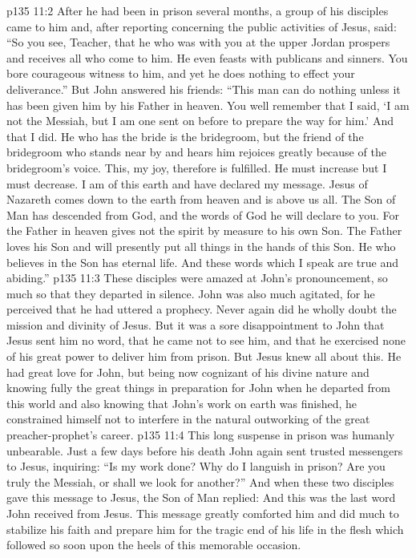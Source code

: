 \vs p135 11:2 \pc After he had been in prison several months, a group of his disciples came to him and, after reporting concerning the public activities of Jesus, said: “So you see, Teacher, that he who was with you at the upper Jordan prospers and receives all who come to him. He even feasts with publicans and sinners. You bore courageous witness to him, and yet he does nothing to effect your deliverance.” But John answered his friends: “This man can do nothing unless it has been given him by his Father in heaven. You well remember that I said, ‘I am not the Messiah, but I am one sent on before to prepare the way for him.’ And that I did. He who has the bride is the bridegroom, but the friend of the bridegroom who stands near by and hears him rejoices greatly because of the bridegroom’s voice. This, my joy, therefore is fulfilled. He must increase but I must decrease. I am of this earth and have declared my message. Jesus of Nazareth comes down to the earth from heaven and is above us all. The Son of Man has descended from God, and the words of God he will declare to you. For the Father in heaven gives not the spirit by measure to his own Son. The Father loves his Son and will presently put all things in the hands of this Son. He who believes in the Son has eternal life. And these words which I speak are true and abiding.”
\vs p135 11:3 \pc These disciples were amazed at John’s pronouncement, so much so that they departed in silence. John was also much agitated, for he perceived that he had uttered a prophecy. Never again did he wholly doubt the mission and divinity of Jesus. But it was a sore disappointment to John that Jesus sent him no word, that he came not to see him, and that he exercised none of his great power to deliver him from prison. But Jesus knew all about this. He had great love for John, but being now cognizant of his divine nature and knowing fully the great things in preparation for John when he departed from this world and also knowing that John’s work on earth was finished, he constrained himself not to interfere in the natural outworking of the great preacher\hyp{}prophet’s career.
\vs p135 11:4 \pc This long suspense in prison was humanly unbearable. Just a few days before his death John again sent trusted messengers to Jesus, inquiring: “Is my work done? Why do I languish in prison? Are you truly the Messiah, or shall we look for another?” And when these two disciples gave this message to Jesus, the Son of Man replied:  And this was the last word John received from Jesus. This message greatly comforted him and did much to stabilize his faith and prepare him for the tragic end of his life in the flesh which followed so soon upon the heels of this memorable occasion.
